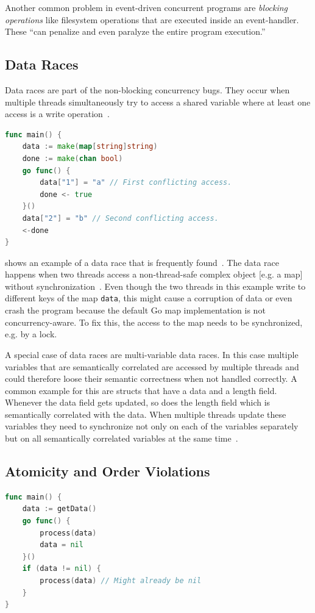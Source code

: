 \documentclass[conference]{IEEEtran}
\begin{document}
Another common problem in event-driven concurrent programs are \emph{blocking operations} like filesystem operations that are executed inside an event-handler.
These ``can penalize and even paralyze the entire program execution.''~\cite{tchamgoue2012testing}

\subsection{Data Races}

Data races are part of the non-blocking concurrency bugs.
They occur when multiple threads simultaneously try to access a shared variable where at least one access is a write operation~\cite{serebry2009threadsanitizer}.

\begin{lstlisting}[float=h, language=Go, label=lst:race, caption=Data race by concurrently accessing a map]
func main() {
	data := make(map[string]string)
	done := make(chan bool)
	go func() {
		data["1"] = "a" // First conflicting access.
		done <- true
	}()
	data["2"] = "b" // Second conflicting access.
	<-done
}
\end{lstlisting}

 shows an example of a data race that is frequently found~\cite{serebry2009threadsanitizer}.
The data race happens when two threads access a non-thread-safe complex object [e.g. a map] without synchronization~\cite{serebry2009threadsanitizer}.
Even though the two threads in this example write to different keys of the map \lstinline{data}, this might cause a corruption of data or even crash the program because the default Go map implementation is not concurrency-aware.
To fix this, the access to the map needs to be synchronized, e.g. by a lock.

A special case of data races are multi-variable data races.
In this case multiple variables that are semantically correlated are accessed by multiple threads and could therefore loose their semantic correctness when not handled correctly.
A common example for this are structs that have a data and a length field.
Whenever the data field gets updated, so does the length field which is semantically correlated with the data.
When multiple threads update these variables they need to synchronize not only on each of the variables separately but on all semantically correlated variables at the same time~\cite{lu2007muvi}.

\subsection{Atomicity and Order Violations}
\begin{lstlisting}[float=h, language=Go, label=lst:order, caption=Test-and-Use bug pattern -- Order violation]
func main() {
    data := getData()
    go func() {
        process(data)
        data = nil
    }()
    if (data != nil) {
        process(data) // Might already be nil
    }
}
\end{lstlisting}
\end{document}
